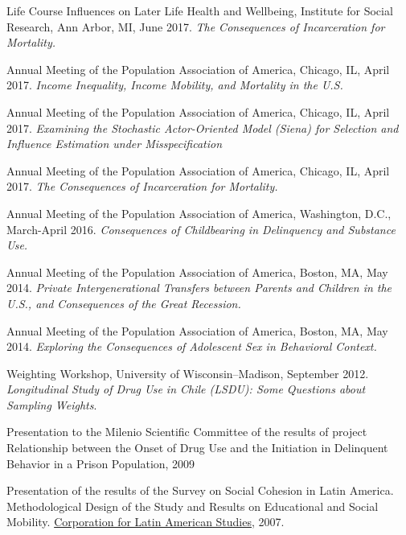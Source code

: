 \documentclass[10pt,letterpaper]{article}
\renewenvironment{itemize}{
  \begin{list}{}{
    \setlength{\leftmargin}{1.5em}
    \setlength{\itemsep}{0.25em}
    \setlength{\parskip}{0pt}
    \setlength{\parsep}{0.25em}
  }
}{
  \end{list}
}
\begin{document}
\begin{itemize}

\item Life Course Influences on Later Life Health and Wellbeing, Institute for Social Research, Ann Arbor, MI, June 2017. {\textit{The Consequences of Incarceration for Mortality.}}


\item  Annual Meeting of the Population Association of America, Chicago, IL, April 2017. {\textit{Income Inequality, Income Mobility, and Mortality in the U.S.}}

\item  Annual Meeting of the Population Association of America, Chicago, IL, April 2017. {\textit{Examining the Stochastic Actor-Oriented Model (Siena) for Selection and Influence Estimation under Misspecification}}

\item  Annual Meeting of the Population Association of America, Chicago, IL, April 2017. {\textit{The Consequences of Incarceration for Mortality.}}

\item  Annual Meeting of the Population Association of America, Washington, D.C., March-April 2016. {\textit{Consequences of Childbearing in Delinquency and Substance Use.}}

\item  Annual Meeting of the Population Association of America, Boston, MA, May 2014. {\textit{Private Intergenerational Transfers between Parents and Children in the U.S., and Consequences of the Great Recession.}}

\item  Annual Meeting of the Population Association of America, Boston, MA, May 2014. {\textit{Exploring the Consequences of Adolescent Sex in Behavioral Context.}}

\item Weighting Workshop, University of Wisconsin–Madison, September 2012. \textit{Longitudinal Study of Drug Use in Chile (LSDU): Some Questions about Sampling Weights}.

\item	Presentation to the Milenio Scientific Committee of the results of project Relationship between the Onset of Drug Use and the Initiation in Delinquent Behavior in a Prison Population, 2009

\item Presentation of the results of the Survey on Social Cohesion in Latin America. Methodological Design of the Study and Results on Educational and Social Mobility. \href{http://www.cieplan.org/}{Corporation for Latin American Studies}, 2007.


\end{itemize}
\end{document}
